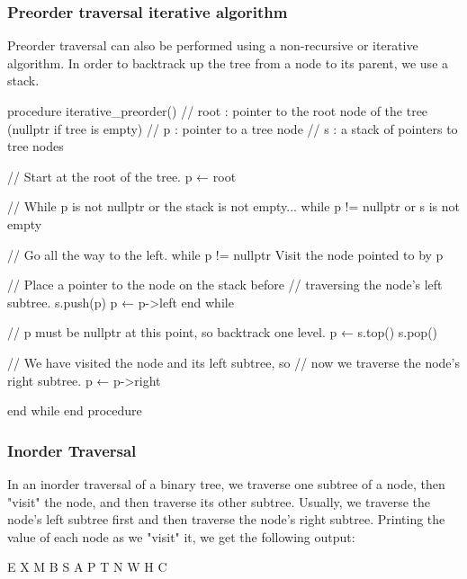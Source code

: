 \documentclass{report}
\begin{document}
    \subsubsection{Preorder traversal iterative algorithm}
    \bigbreak \noindent 
    Preorder traversal can also be performed using a non-recursive or iterative algorithm. In order to backtrack up the tree from a node to its parent, we use a stack.
    \bigbreak \noindent 
    \begin{cppcode}
    procedure iterative_preorder()
        // root : pointer to the root node of the tree (nullptr if tree is empty)
        // p    : pointer to a tree node
        // s    : a stack of pointers to tree nodes

        // Start at the root of the tree.
        p ← root

        // While p is not nullptr or the stack is not empty... 
        while p != nullptr or s is not empty

            // Go all the way to the left.
            while p != nullptr
                Visit the node pointed to by p

                // Place a pointer to the node on the stack before
                // traversing the node's left subtree.
                s.push(p)
                p ← p->left
            end while

            // p must be nullptr at this point, so backtrack one level.
            p ← s.top()
            s.pop()

            // We have visited the node and its left subtree, so
            // now we traverse the node's right subtree.
            p ← p->right

        end while
    end procedure
    \end{cppcode}

    \pagebreak 
    \subsubsection{Inorder Traversal}
    \bigbreak \noindent 
    In an inorder traversal of a binary tree, we traverse one subtree of a node, then "visit" the node, and then traverse its other subtree. Usually, we traverse the node's left subtree first and then traverse the node's right subtree.
    \bigbreak \noindent 
    \bigbreak \noindent 
    Printing the value of each node as we "visit" it, we get the following output:
    \begin{center}
        E X M B S A P T N W H C
    \end{center}
    \bigbreak \noindent 
\end{document}
